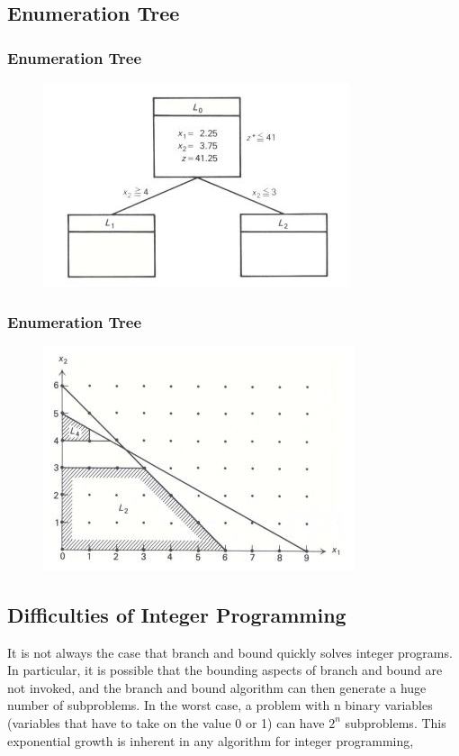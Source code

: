 \documentclass{beamer}
\begin{document}
\subsection{Enumeration Tree}
\begin{frame}
	\frametitle{Enumeration Tree}
\begin{figure}
\centering
\includegraphics[width=0.7\linewidth]{enumerationtree1}
\caption{}
\label{fig:enumerationtree1}
\end{figure}
	
\end{frame}
\begin{frame}
	\frametitle{Enumeration Tree}
	\begin{figure}
		\centering
		\includegraphics[width=0.7\linewidth]{enumerationtree2}
		\caption{}
		\label{fig:enumerationtree2}
	\end{figure}
	
\end{frame}
\subsection{Difficulties of Integer Programming}
\begin{frame}
	It is not always the case that branch and bound quickly
	solves integer programs. In particular, it is possible that the bounding aspects
	of branch and bound are not invoked, and the branch and bound algorithm can
	then generate a huge number of subproblems. In the worst case, a problem
	with n binary variables (variables that have to take on the value 0 or 1) can
	have $2^n$ subproblems. This exponential growth is inherent in any algorithm for
	integer programming, 
\end{frame}
\end{document}
